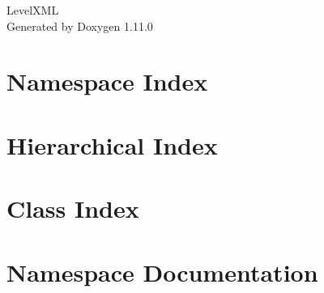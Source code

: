 \documentclass[twoside]{book}
\newcommand{\+}{\discretionary{\mbox{\scriptsize$\hookleftarrow$}}{}{}}
\newcommand{\clearemptydoublepage}{%
    \newpage{\pagestyle{empty}\cleardoublepage}%
  }
\begin{document}
  \raggedbottom
    \hypersetup{pageanchor=false,
                bookmarksnumbered=true,
                pdfencoding=unicode
               }
  \begin{titlepage}
  \vspace*{7cm}
  \begin{center}%
  {\Large Level\+XML}\\
  \vspace*{1cm}
  {\large Generated by Doxygen 1.11.0}\\
  \end{center}
  \end{titlepage}
  \clearemptydoublepage
  \tableofcontents
  \clearemptydoublepage
  \hypersetup{pageanchor=true}
\chapter{Namespace Index}

\chapter{Hierarchical Index}

\chapter{Class Index}

\chapter{Namespace Documentation}

\end{document}
